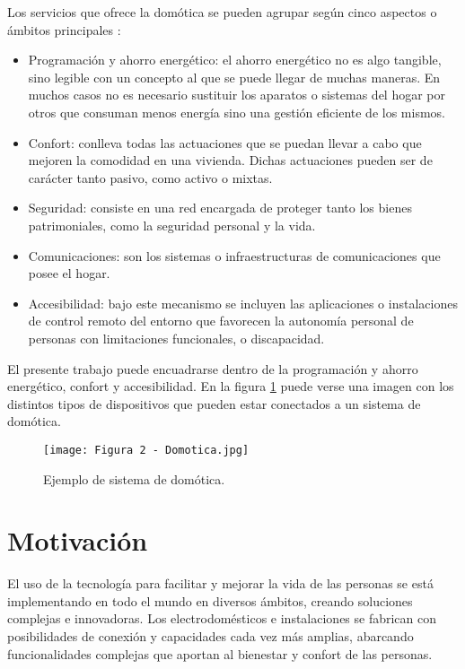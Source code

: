Los servicios que ofrece la domótica se pueden agrupar según cinco aspectos o ámbitos principales \citep{2}:

\begin{itemize}
	\item Programación y ahorro energético: el ahorro energético no es algo tangible, sino legible con un concepto al que se puede llegar de muchas maneras. En muchos casos no es necesario sustituir los aparatos o sistemas del hogar por otros que consuman menos energía sino una gestión eficiente de los mismos.
	\item Confort: conlleva todas las actuaciones que se puedan llevar a cabo que mejoren la comodidad en una vivienda. Dichas actuaciones pueden ser de carácter tanto pasivo, como activo o mixtas.
	\item Seguridad: consiste en una red encargada de proteger tanto los bienes patrimoniales, como la seguridad personal y la vida.
	\item Comunicaciones: son los sistemas o infraestructuras de comunicaciones que posee el hogar.
	\item Accesibilidad: bajo este mecanismo se incluyen las aplicaciones o instalaciones de control remoto del entorno que favorecen la autonomía personal de personas con limitaciones funcionales, o discapacidad.
\end{itemize}

El presente trabajo puede encuadrarse dentro de la programación y ahorro energético, confort y accesibilidad. En la figura \ref{fig:2} puede verse una imagen con los distintos tipos de dispositivos que pueden estar conectados a un sistema de domótica.

\begin{figure}[h]
\centering
\texttt{[image: Figura 2 - Domotica.jpg]}
\caption[Ejemplo de sistema de domótica]{Ejemplo de sistema de domótica. \protect\footnotemark}
\label{fig:2}
\end{figure}

\section{Motivación}

El uso de la tecnología para facilitar y mejorar la vida de las personas se está implementando en todo el mundo en diversos ámbitos, creando soluciones complejas e innovadoras. Los electrodomésticos e instalaciones se fabrican con posibilidades de conexión y capacidades cada vez más amplias, abarcando funcionalidades complejas que aportan al bienestar y confort de las personas.

